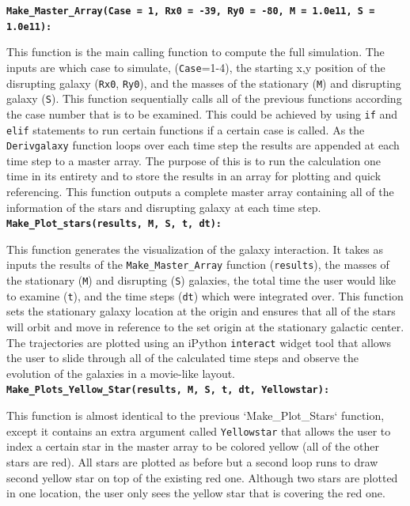 \documentclass[11pt]{article}
\begin{document}
\textbf{\texttt{Make\_Master\_Array(Case = 1, Rx0 = -39, Ry0 = -80, M = 1.0e11, S = 1.0e11):}}

This function is the main calling function to compute the full simulation.  The inputs are which case to simulate, (\texttt{Case}=1-4), the starting x,y position of the disrupting galaxy (\texttt{Rx0}, \texttt{Ry0}), and the masses of the stationary (\texttt{M}) and disrupting galaxy (\texttt{S}).  This function sequentially calls all of the previous functions according the case number that is to be examined.  This could be achieved by using \texttt{if} and \texttt{elif} statements to run certain functions if a certain case is called.   As the \texttt{Derivgalaxy} function loops over each time step the results are appended at each time step to a master array.  The purpose of this is to run the calculation one time in its entirety and to store the results in an array for plotting and quick referencing.  This function outputs a complete master array containing all of the information of the stars and disrupting galaxy at each time step.\\

\textbf{\texttt{Make\_Plot\_stars(results, M, S, t, dt):}}

This function generates the visualization of the galaxy interaction.  It takes as inputs the results of the \texttt{Make\_Master\_Array} function (\texttt{results}), the masses of the stationary (\texttt{M}) and disrupting (\texttt{S}) galaxies, the total time the user would like to examine (\texttt{t}), and the time steps (\texttt{dt}) which were integrated over.  This function sets the stationary galaxy location at the origin and ensures that all of the stars will orbit and move in reference to the set origin at the stationary galactic center.  The trajectories are plotted using an iPython \texttt{interact} widget tool that allows the user to slide through all of the calculated time steps and observe the evolution of the galaxies in a movie-like layout. \\

\textbf{\texttt{Make\_Plots\_Yellow\_Star(results, M, S, t, dt, Yellowstar):}}

This function is almost identical to the previous `Make\_Plot\_Stars` function, except it contains an extra argument called \texttt{Yellowstar} that allows the user to index a certain star in the master array to be colored yellow (all of the other stars are red).  All stars are plotted as before but a second loop runs to draw second yellow star on top of the existing red one.  Although two stars are plotted in one location, the user only sees the yellow star that is covering the red one. 
\end{document}
